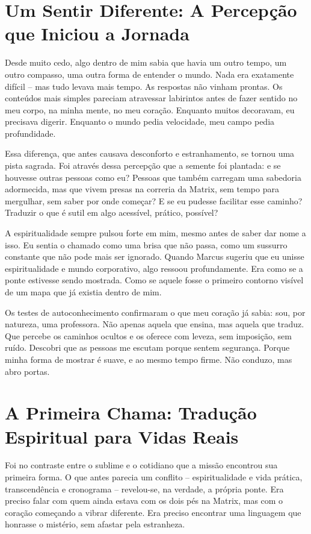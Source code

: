 \documentclass[12pt,a4paper]{book}
\begin{document}
\section{Um Sentir Diferente: A Percepção que Iniciou a Jornada}

Desde muito cedo, algo dentro de mim sabia que havia um outro tempo, um outro compasso, uma outra forma de entender o mundo. Nada era exatamente difícil -- mas tudo levava mais tempo. As respostas não vinham prontas. Os conteúdos mais simples pareciam atravessar labirintos antes de fazer sentido no meu corpo, na minha mente, no meu coração. Enquanto muitos decoravam, eu precisava digerir. Enquanto o mundo pedia velocidade, meu campo pedia profundidade.

Essa diferença, que antes causava desconforto e estranhamento, se tornou uma pista sagrada. Foi através dessa percepção que a semente foi plantada: e se houvesse outras pessoas como eu? Pessoas que também carregam uma sabedoria adormecida, mas que vivem presas na correria da Matrix, sem tempo para mergulhar, sem saber por onde começar? E se eu pudesse facilitar esse caminho? Traduzir o que é sutil em algo acessível, prático, possível?

A espiritualidade sempre pulsou forte em mim, mesmo antes de saber dar nome a isso. Eu sentia o chamado como uma brisa que não passa, como um sussurro constante que não pode mais ser ignorado. Quando Marcus sugeriu que eu unisse espiritualidade e mundo corporativo, algo ressoou profundamente. Era como se a ponte estivesse sendo mostrada. Como se aquele fosse o primeiro contorno visível de um mapa que já existia dentro de mim.

Os testes de autoconhecimento confirmaram o que meu coração já sabia: sou, por natureza, uma professora. Não apenas aquela que ensina, mas aquela que traduz. Que percebe os caminhos ocultos e os oferece com leveza, sem imposição, sem ruído. Descobri que as pessoas me escutam porque sentem segurança. Porque minha forma de mostrar é suave, e ao mesmo tempo firme. Não conduzo, mas abro portas.

\section{A Primeira Chama: Tradução Espiritual para Vidas Reais}

Foi no contraste entre o sublime e o cotidiano que a missão encontrou sua primeira forma. O que antes parecia um conflito -- espiritualidade e vida prática, transcendência e cronograma -- revelou-se, na verdade, a própria ponte. Era preciso falar com quem ainda estava com os dois pés na Matrix, mas com o coração começando a vibrar diferente. Era preciso encontrar uma linguagem que honrasse o mistério, sem afastar pela estranheza.
\end{document}

